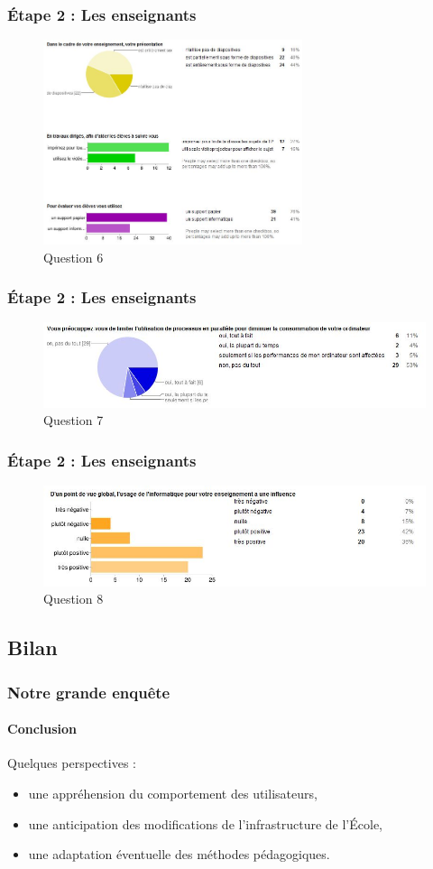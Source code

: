 \documentclass[slidetop,11pt]{beamer}
\begin{document}
\begin{frame} 
  \frametitle{\'Etape 2 : Les enseignants}
  \begin{figure}[h!]
  \includegraphics[height=6cm]{i11.JPG}
  \caption{Question 6}
  \label{i5}
  \end{figure}
\end{frame}

\begin{frame} 
  \frametitle{\'Etape 2 : Les enseignants}
  \begin{figure}[h!]
  \includegraphics[width=\textwidth]{i12.JPG}
  \caption{Question 7}
  \label{i5}
  \end{figure}
\end{frame}

\begin{frame} 
  \frametitle{\'Etape 2 : Les enseignants}
  \begin{figure}[h!]
  \includegraphics[width=\textwidth]{i13.JPG}
  \caption{Question 8}
  \label{i5}
  \end{figure}
\end{frame}

\subsection{Bilan}
\begin{frame}[label=pagesimple]
  \frametitle{Notre grande enquête}
  \framesubtitle{Conclusion}
  Quelques perspectives :
  \begin{itemize}[<+->]
    \item une appréhension du comportement des utilisateurs,
    \item une anticipation des modifications de l'infrastructure de l'\'Ecole,
    \item une adaptation éventuelle des méthodes pédagogiques.
    \end{itemize}
  \bigskip
\end{frame}
\end{document}
